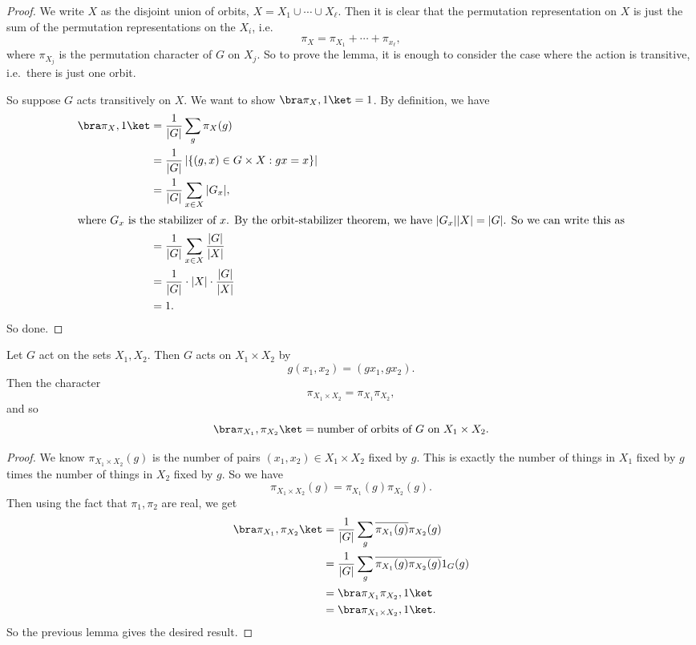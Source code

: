 \documentclass[a4paper]{article}
\begin{document}
\begin{proof}
  We write $X$ as the disjoint union of orbits, $X = X_1 \cup \cdots \cup X_\ell$. Then it is clear that the permutation representation on $X$ is just the sum of the permutation representations on the $X_i$, i.e.
  \[
    \pi_X = \pi_{X_1} + \cdots + \pi_{x_\ell},
  \]
  where $\pi_{X_j}$ is the permutation character of $G$ on $X_j$. So to prove the lemma, it is enough to consider the case where the action is transitive, i.e.\ there is just one orbit.

  So suppose $G$ acts transitively on $X$. We want to show $\bra \pi_X, 1\ket = 1$. By definition, we have
  \begin{align*}
    \bra \pi_X, 1 \ket &= \frac{1}{|G|} \sum_g \pi_X(g) \\
    &= \frac{1}{|G|} \left|\{(g, x) \in G\times X: gx = x\}\right|\\
    &= \frac{1}{|G|} \sum_{x \in X} |G_x|,\\
    \intertext{where $G_x$ is the stabilizer of $x$. By the orbit-stabilizer theorem, we have $|G_x||X| = |G|$. So we can write this as}
    &= \frac{1}{|G|} \sum_{x \in X} \frac{|G|}{|X|}\\
    &= \frac{1}{|G|} \cdot |X| \cdot \frac{|G|}{|X|}\\
    &= 1.
  \end{align*}
  So done.
\end{proof}

\begin{lemma}
  Let $G$ act on the sets $X_1, X_2$. Then $G$ acts on $X_1 \times X_2$ by
  \[
    g(x_1, x_2) = (g x_1, g x_2).
  \]
  Then the character
  \[
    \pi_{X_1 \times X_2} = \pi_{X_1}\pi_{X_2},
  \]
  and so
  \[
    \bra \pi_{X_1}, \pi_{X_2}\ket = \text{number of orbits of }G\text{ on }X_1 \times X_2.
  \]
\end{lemma}

\begin{proof}
  We know $\pi_{X_1 \times X_2}(g)$ is the number of pairs $(x_1, x_2) \in X_1 \times X_2$ fixed by $g$. This is exactly the number of things in $X_1$ fixed by $g$ times the number of things in $X_2$ fixed by $g$. So we have
  \[
    \pi_{X_1 \times X_2}(g) = \pi_{X_1}(g) \pi_{X_2}(g).
  \]
  Then using the fact that $\pi_1, \pi_2$ are real, we get
  \begin{align*}
    \bra \pi_{X_1}, \pi_{X_2}\ket &= \frac{1}{|G|} \sum_g \overline{\pi_{X_1}(g)}\pi_{X_2}(g)\\
    &= \frac{1}{|G|} \sum_g \overline{\pi_{X_1}(g) \pi_{X_2}(g)} 1_G(g)\\
    &= \bra \pi_{X_1}\pi_{X_2}, 1\ket \\
    &= \bra \pi_{X_1\times X_2}, 1\ket.
  \end{align*}
  So the previous lemma gives the desired result.
\end{proof}
\end{document}
